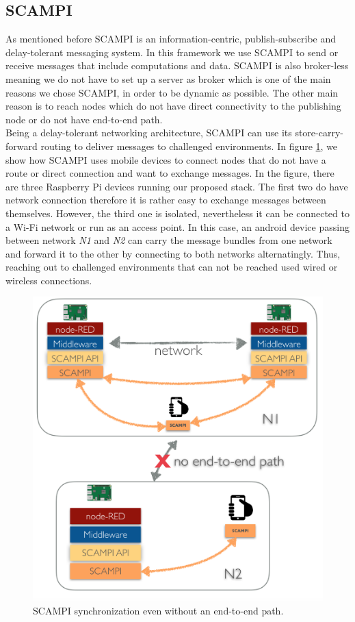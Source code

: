 \subsection{SCAMPI}
As mentioned before SCAMPI is an information-centric, publish-subscribe and delay-tolerant messaging system. In this framework we use SCAMPI to send or receive messages that include computations and data. SCAMPI is also broker-less meaning we do not have to set up a server as broker which is one of the main reasons we chose SCAMPI, in order to be dynamic as possible. The other main reason is to reach nodes which do not have direct connectivity to the publishing node or do not have end-to-end path. \\

\noindent Being a delay-tolerant networking architecture, SCAMPI can use its store-carry-forward routing to deliver messages to challenged environments. In figure \ref{fig:scampi-design}, we show how SCAMPI uses mobile devices to connect nodes that do not have a route or  direct connection and want to exchange messages. In the figure, there are three Raspberry Pi devices running our proposed stack. The first two do have network connection therefore it is rather easy to exchange messages between themselves. However, the third one is isolated, nevertheless it can be connected to a Wi-Fi network or run as an access point. In this case, an android device passing  between network \textit{N1} and \textit{N2} can carry the message bundles from one network and forward it to the other by connecting to both networks alternatingly.  Thus, reaching out to challenged environments that can not be reached used wired or wireless connections.

\begin{figure}[H]
	\centering
	\includegraphics[scale=0.4]{images/scampi.png}
	\caption{SCAMPI synchronization even without an end-to-end path. }
	\label{fig:scampi-design}
\end{figure}

